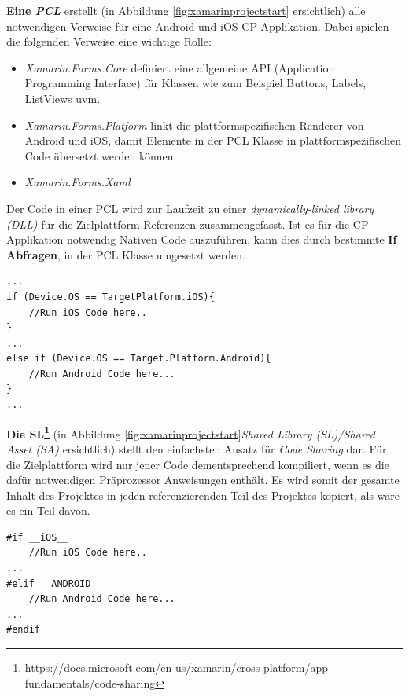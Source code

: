 	\textbf{Eine \textit{PCL}} erstellt (in Abbildung \ref{fig:xamarinprojectstart} ersichtlich) alle notwendigen Verweise für eine Android und iOS CP Applikation. Dabei spielen die folgenden Verweise eine wichtige Rolle:
	\begin{itemize}
		\setlength\itemsep{0em}
		\item \textit{Xamarin.Forms.Core} definiert eine allgemeine API (Application Programming Interface) für Klassen wie zum Beispiel Buttons, Labels, ListViews uvm.
		\item \textit{Xamarin.Forms.Platform} linkt die plattformspezifischen Renderer von Android und iOS, damit Elemente in der PCL Klasse in plattformspezifischen Code übersetzt werden können.
		\item \textit{Xamarin.Forms.Xaml} 
	\end{itemize}
	Der Code in einer PCL wird zur Laufzeit zu einer \textit{dynamically-linked library (DLL)} für die Zielplattform Referenzen zusammengefasst. Ist es für die CP Applikation notwendig Nativen Code auszuführen, kann dies durch bestimmte \textbf{If Abfragen}, in der PCL Klasse umgesetzt werden.\\

	\begin{lstlisting}[caption={Ausführung von plattformspezifischen Code in PCL},label={lst:xamarinpcl},captionpos=b,style=csharp]
...
if (Device.OS == TargetPlatform.iOS){
	//Run iOS Code here..
}
...
else if (Device.OS == Target.Platform.Android){
	//Run Android Code here...
}
...
	\end{lstlisting}

	\textbf{Die SL\footnote{https://docs.microsoft.com/en-us/xamarin/cross-platform/app-fundamentals/code-sharing}} (in Abbildung \ref{fig:xamarinprojectstart}\textit{Shared Library (SL)/Shared Asset (SA)} ersichtlich) stellt den einfachsten Ansatz für \textit{Code Sharing} dar. Für die Zielplattform wird nur jener Code dementsprechend kompiliert, wenn es die dafür notwendigen Präprozessor Anweisungen enthält. Es wird somit der gesamte Inhalt des Projektes in jeden referenzierenden Teil des Projektes kopiert, als wäre es ein Teil davon.\\

	\begin{lstlisting}[caption={Ausführung von plattformspezifischen Code in SA/SL},label={lst:xamarinslsa},captionpos=b,style=csharp]
#if __iOS__
	//Run iOS Code here..
...
#elif __ANDROID__
	//Run Android Code here...
...
#endif
	\end{lstlisting}

